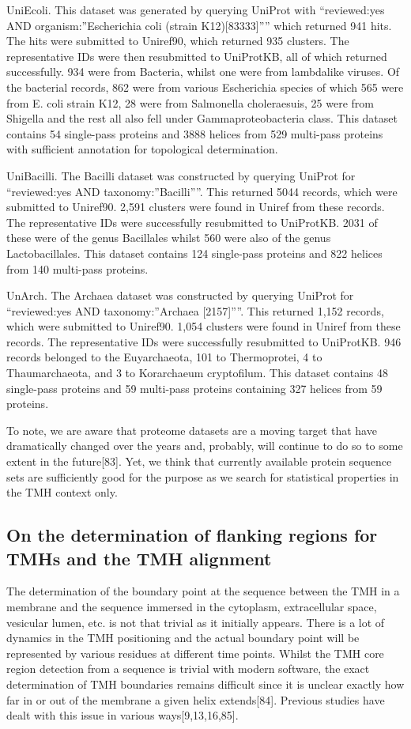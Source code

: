 UniEcoli. This dataset was generated by querying UniProt with “reviewed:yes AND organism:”Escherichia coli (strain K12)[83333]”” which returned 941 hits. The hits were submitted to Uniref90, which returned 935 clusters. The representative IDs were then resubmitted to UniProtKB, all of which returned successfully. 934 were from Bacteria, whilst one were from lambdalike viruses. Of the bacterial records, 862 were from various Escherichia species of which 565 were from E. coli strain K12, 28 were from Salmonella choleraesuis, 25 were from Shigella and the rest all also fell under Gammaproteobacteria class. This dataset contains 54 single-pass proteins and 3888 helices from 529 multi-pass proteins with sufficient annotation for topological determination.

UniBacilli. The Bacilli dataset was constructed by querying UniProt for “reviewed:yes AND taxonomy:”Bacilli””. This returned 5044 records, which were submitted to Uniref90. 2,591 clusters were found in Uniref from these records. The representative IDs were successfully resubmitted to UniProtKB. 2031 of these were of the genus Bacillales whilst 560 were also of the genus Lactobacillales. This dataset contains 124 single-pass proteins and 822 helices from 140 multi-pass proteins.

UnArch. The Archaea dataset was constructed by querying UniProt for “reviewed:yes AND taxonomy:”Archaea [2157]””. This returned 1,152 records, which were submitted to Uniref90. 1,054 clusters were found in Uniref from these records. The representative IDs were successfully resubmitted to UniProtKB. 946 records belonged to the Euyarchaeota, 101 to Thermoprotei, 4 to Thaumarchaeota, and 3 to Korarchaeum cryptofilum. This dataset contains 48 single-pass proteins and 59 multi-pass proteins containing 327 helices from 59 proteins.

To note, we are aware that proteome datasets are a moving target that have dramatically changed over the years and, probably, will continue to do so to some extent in the future[83]. Yet, we think that currently available protein sequence sets are sufficiently good for the purpose as we search for statistical properties in the TMH context only.

\subsection{On the determination of flanking regions for TMHs and the TMH alignment}

The determination of the boundary point at the sequence between the TMH in a membrane and the sequence immersed in the cytoplasm, extracellular space, vesicular lumen, etc. is not that trivial as it initially appears. There is a lot of dynamics in the TMH positioning and the actual boundary point will be represented by various residues at different time points. Whilst the TMH core region detection from a sequence is trivial with modern software, the exact determination of TMH boundaries remains difficult since it is unclear exactly how far in or out of the membrane a given helix extends[84]. Previous studies have dealt with this issue in various ways[9,13,16,85].

